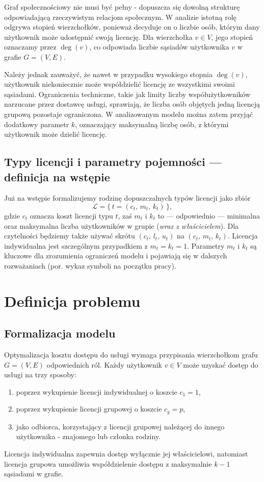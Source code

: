 Graf społecznościowy nie musi być pełny - dopuszcza się dowolną strukturę odpowiadającą rzeczywistym relacjom społecznym. W analizie istotną rolę odgrywa stopień wierzchołków, ponieważ decyduje on o liczbie osób, którym dany użytkownik może udostępnić swoją licencję. Dla wierzchołka \( v \in V \), jego stopień oznaczamy przez \( \deg(v) \), co odpowiada liczbie sąsiadów użytkownika \( v \) w grafie \( G = (V, E) \).

Należy jednak zauważyć, że nawet w przypadku wysokiego stopnia \( \deg(v) \), użytkownik niekoniecznie może współdzielić licencję ze wszystkimi swoimi sąsiadami. Ograniczenia techniczne, takie jak limity liczby współużytkowników narzucane przez dostawcę usługi, sprawiają, że liczba osób objętych jedną licencją grupową pozostaje ograniczona. W analizowanym modelu można zatem przyjąć dodatkowy parametr \( k \), oznaczający maksymalną liczbę osób, z którymi użytkownik może dzielić licencję.

\subsection{Typy licencji i parametry pojemności — definicja na wstępie}
\label{sec:license-early-def}
Już na wstępie formalizujemy rodzinę dopuszczalnych typów licencji jako zbiór
\[
\mathcal{L} = \bigl\{\, t = (c_t,\, m_t,\, k_t)\,\bigr\},
\]
gdzie \(c_t\) oznacza koszt licencji typu \(t\), zaś \(m_t\) i \(k_t\) to — odpowiednio — minimalna oraz maksymalna liczba użytkowników w grupie (\emph{wraz z właścicielem}). Dla czytelności będziemy także używać skrótu \( (c_t,\, l_t,\, u_t) \) na \( (c_t,\, m_t,\, k_t) \). Licencja indywidualna jest szczególnym przypadkiem z \(m_t=k_t=1\). Parametry \(m_t\) i \(k_t\) są kluczowe dla zrozumienia ograniczeń modelu i pojawiają się w dalszych rozważaniach (por. wykaz symboli na początku pracy).


\section{Definicja problemu}

\subsection{Formalizacja modelu}
\label{sec:model-formal}

Optymalizacja kosztu dostępu do usługi wymaga przypisania wierzchołkom grafu $G = (V, E)$ odpowiednich ról. Każdy użytkownik $v \in V$ może uzyskać dostęp do usługi na trzy sposoby:
\begin{enumerate}
    \item poprzez wykupienie licencji indywidualnej o koszcie $c_1 = 1$,
    \item poprzez wykupienie licencji grupowej o koszcie $c_g = p$,
    \item jako odbiorca, korzystający z licencji grupowej należącej do innego  użytkownika - znajomego lub członka rodziny.
\end{enumerate}
Licencja indywidualna zapewnia dostęp wyłącznie jej właścicielowi, natomiast licencja grupowa umożliwia współdzielenie dostępu z maksymalnie $k-1$ sąsiadami w grafie.

